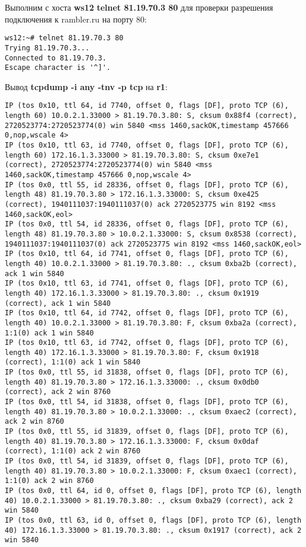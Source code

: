 \documentclass[a4paper,12pt]{article}
\begin{document}
Выполним с хоста \textbf{ws12} \textbf{telnet 81.19.70.3 80} для проверки
разрешения подключения к rambler.ru на порту 80:
\begin{Verbatim}
ws12:~# telnet 81.19.70.3 80
Trying 81.19.70.3...
Connected to 81.19.70.3.
Escape character is '^]'.
\end{Verbatim}

Вывод \textbf{tcpdump -i any -tnv -p tcp} на \textbf{r1}:
\begin{Verbatim}
IP (tos 0x10, ttl 64, id 7740, offset 0, flags [DF], proto TCP (6), length 60) 10.0.2.1.33000 > 81.19.70.3.80: S, cksum 0x88f4 (correct), 2720523774:2720523774(0) win 5840 <mss 1460,sackOK,timestamp 457666 0,nop,wscale 4>
IP (tos 0x10, ttl 63, id 7740, offset 0, flags [DF], proto TCP (6), length 60) 172.16.1.3.33000 > 81.19.70.3.80: S, cksum 0xe7e1 (correct), 2720523774:2720523774(0) win 5840 <mss 1460,sackOK,timestamp 457666 0,nop,wscale 4>
IP (tos 0x0, ttl 55, id 28336, offset 0, flags [DF], proto TCP (6), length 48) 81.19.70.3.80 > 172.16.1.3.33000: S, cksum 0xe425 (correct), 1940111037:1940111037(0) ack 2720523775 win 8192 <mss 1460,sackOK,eol>
IP (tos 0x0, ttl 54, id 28336, offset 0, flags [DF], proto TCP (6), length 48) 81.19.70.3.80 > 10.0.2.1.33000: S, cksum 0x8538 (correct), 1940111037:1940111037(0) ack 2720523775 win 8192 <mss 1460,sackOK,eol>
IP (tos 0x10, ttl 64, id 7741, offset 0, flags [DF], proto TCP (6), length 40) 10.0.2.1.33000 > 81.19.70.3.80: ., cksum 0xba2b (correct), ack 1 win 5840
IP (tos 0x10, ttl 63, id 7741, offset 0, flags [DF], proto TCP (6), length 40) 172.16.1.3.33000 > 81.19.70.3.80: ., cksum 0x1919 (correct), ack 1 win 5840
IP (tos 0x10, ttl 64, id 7742, offset 0, flags [DF], proto TCP (6), length 40) 10.0.2.1.33000 > 81.19.70.3.80: F, cksum 0xba2a (correct), 1:1(0) ack 1 win 5840
IP (tos 0x10, ttl 63, id 7742, offset 0, flags [DF], proto TCP (6), length 40) 172.16.1.3.33000 > 81.19.70.3.80: F, cksum 0x1918 (correct), 1:1(0) ack 1 win 5840
IP (tos 0x0, ttl 55, id 31838, offset 0, flags [DF], proto TCP (6), length 40) 81.19.70.3.80 > 172.16.1.3.33000: ., cksum 0x0db0 (correct), ack 2 win 8760
IP (tos 0x0, ttl 54, id 31838, offset 0, flags [DF], proto TCP (6), length 40) 81.19.70.3.80 > 10.0.2.1.33000: ., cksum 0xaec2 (correct), ack 2 win 8760
IP (tos 0x0, ttl 55, id 31839, offset 0, flags [DF], proto TCP (6), length 40) 81.19.70.3.80 > 172.16.1.3.33000: F, cksum 0x0daf (correct), 1:1(0) ack 2 win 8760
IP (tos 0x0, ttl 54, id 31839, offset 0, flags [DF], proto TCP (6), length 40) 81.19.70.3.80 > 10.0.2.1.33000: F, cksum 0xaec1 (correct), 1:1(0) ack 2 win 8760
IP (tos 0x0, ttl 64, id 0, offset 0, flags [DF], proto TCP (6), length 40) 10.0.2.1.33000 > 81.19.70.3.80: ., cksum 0xba29 (correct), ack 2 win 5840
IP (tos 0x0, ttl 63, id 0, offset 0, flags [DF], proto TCP (6), length 40) 172.16.1.3.33000 > 81.19.70.3.80: ., cksum 0x1917 (correct), ack 2 win 5840
\end{Verbatim}
\end{document}
